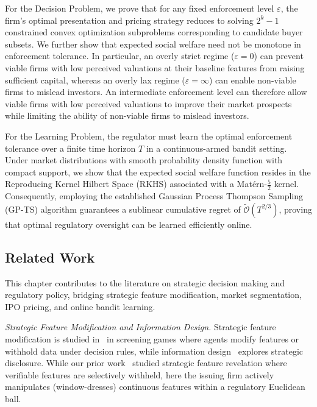 For the Decision Problem, we prove that for any fixed enforcement level $\varepsilon$, the firm's optimal presentation and pricing strategy reduces to solving $2^k-1$ constrained convex optimization subproblems corresponding to candidate buyer subsets. We further show that expected social welfare need not be monotone in enforcement tolerance. In particular, an overly strict regime ($\varepsilon=0$) can prevent viable firms with low perceived valuations at their baseline features from raising sufficient capital, whereas an overly lax regime ($\varepsilon=\infty$) can enable non-viable firms to mislead investors. An intermediate enforcement level can therefore allow viable firms with low perceived valuations to improve their market prospects while limiting the ability of non-viable firms to mislead investors.


For the Learning Problem, the regulator must learn the optimal enforcement tolerance over a finite time horizon $T$ in a continuous-armed bandit setting. Under market distributions with smooth probability density function with compact support, we show that the expected social welfare function resides in the Reproducing Kernel Hilbert Space (RKHS) associated with a Mat\'ern-$\tfrac{5}{2}$ kernel. Consequently, employing the established Gaussian Process Thompson Sampling (GP-TS) algorithm guarantees a sublinear cumulative regret of $\widetilde{\mathcal{O}}(T^{2/3})$, proving that optimal regulatory oversight can be learned efficiently online.


\subsection{Related Work}

This chapter contributes to the literature on strategic decision making and regulatory policy, bridging strategic feature modification, market segmentation, IPO pricing, and online bandit learning.

\textit{Strategic Feature Modification and Information Design.} Strategic feature modification is studied in~\cite{hardt2016strategic,perdomo2020performative,krishnaswamy2021classification,singh2025strategic,singh2026linear} in screening games where agents modify features or withhold data under decision rules, while information design~\cite{kamenica2011bayesian,bergemann2019information} explores strategic disclosure. While our prior work~\cite{singh2026linear} studied strategic feature revelation where verifiable features are selectively withheld, here the issuing firm actively manipulates (window-dresses) continuous features within a regulatory Euclidean ball.

